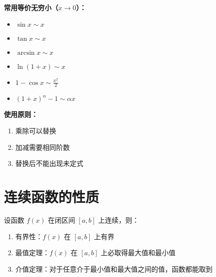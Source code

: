 \documentclass{ctexart}
\begin{document}
\begin{example}[等价无穷小的应用]
\textbf{常用等价无穷小（$x \to 0$）：}
\begin{itemize}
    \item $\sin x \sim x$
    \item $\tan x \sim x$
    \item $\arcsin x \sim x$
    \item $\ln(1+x) \sim x$
    \item $1-\cos x \sim \frac{x^2}{2}$
    \item $(1+x)^\alpha-1 \sim \alpha x$
\end{itemize}

\textbf{使用原则：}
\begin{enumerate}
    \item 乘除可以替换
    \item 加减需要相同阶数
    \item 替换后不能出现未定式
\end{enumerate}
\end{example}

\section{连续函数的性质}
\begin{theorem}[连续函数的性质]
设函数 $f(x)$ 在闭区间 $[a,b]$ 上连续，则：
\begin{enumerate}
    \item 有界性：$f(x)$ 在 $[a,b]$ 上有界
    \item 最值定理：$f(x)$ 在 $[a,b]$ 上必取得最大值和最小值
    \item 介值定理：对于任意介于最小值和最大值之间的值，函数都能取到
\end{enumerate}
\end{theorem}
\end{document}
